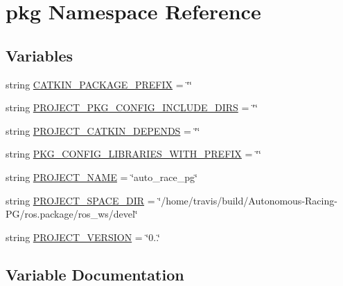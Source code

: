 \hypertarget{namespacepkg}{}\section{pkg Namespace Reference}
\label{namespacepkg}
\subsection*{Variables}
\begin{DoxyCompactItemize}
\item 
string \hyperlink{namespacepkg_ae26c7a5a06b7d738f4d210ca449e6bee}{C\+A\+T\+K\+I\+N\+\_\+\+P\+A\+C\+K\+A\+G\+E\+\_\+\+P\+R\+E\+F\+IX} = \char`\"{}\char`\"{}
\item 
string \hyperlink{namespacepkg_a2760bf8266ff58da440f65ee91b203ab}{P\+R\+O\+J\+E\+C\+T\+\_\+\+P\+K\+G\+\_\+\+C\+O\+N\+F\+I\+G\+\_\+\+I\+N\+C\+L\+U\+D\+E\+\_\+\+D\+I\+RS} = \char`\"{}\char`\"{}
\item 
string \hyperlink{namespacepkg_a17c18447fad253ee1c0d76deec88028c}{P\+R\+O\+J\+E\+C\+T\+\_\+\+C\+A\+T\+K\+I\+N\+\_\+\+D\+E\+P\+E\+N\+DS} = \char`\"{}\char`\"{}
\item 
string \hyperlink{namespacepkg_a433e30cecb4a0123a7c4b384d168e336}{P\+K\+G\+\_\+\+C\+O\+N\+F\+I\+G\+\_\+\+L\+I\+B\+R\+A\+R\+I\+E\+S\+\_\+\+W\+I\+T\+H\+\_\+\+P\+R\+E\+F\+IX} = \char`\"{}\char`\"{}
\item 
string \hyperlink{namespacepkg_a7dfbe99257c26f5e4a3a5483995d9ddc}{P\+R\+O\+J\+E\+C\+T\+\_\+\+N\+A\+ME} = \char`\"{}auto\+\_\+race\+\_\+pg\char`\"{}
\item 
string \hyperlink{namespacepkg_a3f0f1b4bc03c596525e025539ca4332f}{P\+R\+O\+J\+E\+C\+T\+\_\+\+S\+P\+A\+C\+E\+\_\+\+D\+IR} = \char`\"{}/home/travis/build/Autonomous-\/Racing-\/PG/ros.\+package/ros\+\_\+ws/devel\char`\"{}
\item 
string \hyperlink{namespacepkg_ab1037914b9286bb61855131c06149648}{P\+R\+O\+J\+E\+C\+T\+\_\+\+V\+E\+R\+S\+I\+ON} = \char`\"{}0..\char`\"{}
\end{DoxyCompactItemize}


\subsection{Variable Documentation}
